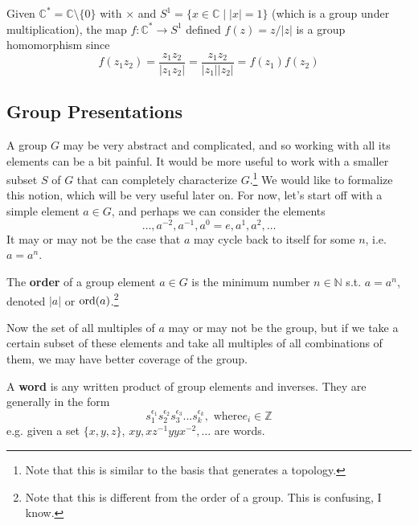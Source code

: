   \begin{example}
    Given $\mathbb{C}^\ast = \mathbb{C} \setminus \{0\}$ with $\times$ and $S^1 = \{x \in \mathbb{C} \mid |x| = 1\}$ (which is a group under multiplication), the map $f: \mathbb{C}^\ast \rightarrow S^1$ defined $f(z) = z/|z|$ is a group homomorphism since 
    \begin{equation}
      f(z_1 z_2) = \frac{z_1 z_2}{|z_1 z_2|} = \frac{z_1 z_2}{|z_1| |z_2|} = f(z_1) f(z_2)
    \end{equation}
  \end{example} 

\subsection{Group Presentations} 

  A group $G$ may be very abstract and complicated, and so working with all its elements can be a bit painful. It would be more useful to work with a smaller subset $S$ of $G$ that can completely characterize $G$.\footnote{Note that this is similar to the basis that generates a topology.} We would like to formalize this notion, which will be very useful later on. For now, let's start off with a simple element $a \in G$, and perhaps we can consider the elements 
  \begin{equation}
    \ldots, a^{-2}, a^{-1}, a^0 = e, a^1, a^2, \ldots
  \end{equation}
  It may or may not be the case that $a$ may cycle back to itself for some $n$, i.e. $a = a^n$. 

  \begin{definition}
    The \textbf{order} of a group element $a \in G$ is the minimum number $n \in \mathbb{N}$ s.t. $a = a^n$, denoted $|a|$ or $\ord(a)$.\footnote{Note that this is different from the order of a group. This is confusing, I know. }
  \end{definition} 

  Now the set of all multiples of $a$ may or may not be the group, but if we take a certain subset of these elements and take all multiples of all combinations of them, we may have better coverage of the group. 

  \begin{definition}[Word]
    A \textbf{word} is any written product of group elements and inverses. They are generally in the form
    \begin{equation}
      s_{1}^{\epsilon_{1}} s_{2}^{\epsilon_{2}} s_{3}^{\epsilon_{3}}... s_{k}^{\epsilon_{k}}, \text{ where} e_i \in \mathbb{Z}
    \end{equation} 
    e.g. given a set $\{x,y,z\}$, $x y, x z^{-1} y y x^{-2},...$ are words. 
  \end{definition}

